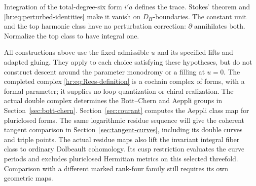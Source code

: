 Integration of the total-degree-six form $i'a$
defines the trace. Stokes' theorem and
\eqref{hr:eq:perturbed-identities} make it vanish on
$D_H$-boundaries. The constant unit and the top
harmonic class have no perturbation correction:
$\partial$ annihilates both. Normalize the top class
to have integral one.

All constructions above use the fixed admissible
$u$ and its specified lifts and adapted gluing.
They apply to each choice satisfying these hypotheses,
but do not construct descent around the parameter
monodromy or a filling at $u=0$.
The completed complex \eqref{hr:eq:Rees-definition}
is a cochain complex of forms, with a formal parameter;
it supplies no loop quantization or chiral realization.
The actual double complex determines the Bott--Chern and
Aeppli groups in Section~\ref{sec:bott-chern}.
Section~\ref{sec:courant} computes the Aeppli class map for
pluriclosed forms. The same logarithmic residue sequence will
give the coherent tangent comparison in
Section~\ref{sec:tangent-curves}, including its double curves
and triple points. The actual residue maps also lift the
invariant integral fiber class to ordinary Dolbeault cohomology.
Its cusp restriction evaluates the curve periods and excludes
pluriclosed Hermitian metrics on this selected threefold.
Comparison with a different marked rank-four family still
requires its own geometric maps.
